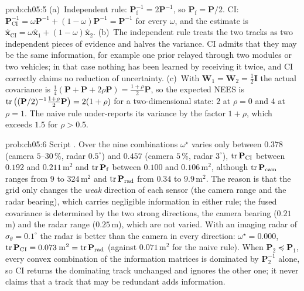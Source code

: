 \begin{sol}{prob:ch05:5}
(a)~Independent rule: $\mathbf{P}_{\mathrm{f}}^{-1}=2\mathbf{P}^{-1}$, so $\mathbf{P}_{\mathrm{f}}=\mathbf{P}/2$. CI: $\mathbf{P}_{\mathrm{CI}}^{-1}=\omega\mathbf{P}^{-1}+(1-\omega)\mathbf{P}^{-1}=\mathbf{P}^{-1}$ for every $\omega$, and the estimate is $\widehat{\mathbf{x}}_{\mathrm{CI}}=\omega\widehat{\mathbf{x}}_{1}+(1-\omega)\widehat{\mathbf{x}}_{2}$. (b)~The independent rule treats the two tracks as two independent pieces of evidence and halves the variance. CI admits that they may be the same information, for example one prior relayed through two modules or two vehicles; in that case nothing has been learned by receiving it twice, and CI correctly claims no reduction of uncertainty. (c)~With $\mathbf{W}_{1}=\mathbf{W}_{2}=\tfrac{1}{2}\mathbf{I}$ the actual covariance is $\tfrac{1}{4}(\mathbf{P}+\mathbf{P}+2\rho\mathbf{P})=\tfrac{1+\rho}{2}\mathbf{P}$, so the expected NEES is $\operatorname{tr}\big((\mathbf{P}/2)^{-1}\tfrac{1+\rho}{2}\mathbf{P}\big)=2(1+\rho)$ for a two-dimensional state: $2$ at $\rho=0$ and $4$ at $\rho=1$. The naive rule under-reports its variance by the factor $1+\rho$, which exceeds $1.5$ for $\rho>0.5$.
\end{sol}

\begin{sol}{prob:ch05:6}
Script . Over the nine combinations $\omega^{\star}$ varies only between $0.378$ (camera $5$--$30$\,\%, radar $0.5^{\circ}$) and $0.457$ (camera $5$\,\%, radar $3^{\circ}$), $\operatorname{tr}\mathbf{P}_{\mathrm{CI}}$ between $0.192$ and $0.211$\,m$^{2}$ and $\operatorname{tr}\mathbf{P}_{\mathrm{f}}$ between $0.100$ and $0.106$\,m$^{2}$, although $\operatorname{tr}\mathbf{P}_{\mathrm{cam}}$ ranges from $9$ to $324$\,m$^{2}$ and $\operatorname{tr}\mathbf{P}_{\mathrm{rad}}$ from $0.34$ to $9.9$\,m$^{2}$. The reason is that the grid only changes the \emph{weak} direction of each sensor (the camera range and the radar bearing), which carries negligible information in either rule; the fused covariance is determined by the two strong directions, the camera bearing ($0.21$\,m) and the radar range ($0.25$\,m), which are not varied. With an imaging radar of $\sigma_{\theta}=0.1^{\circ}$ the radar is better than the camera in every direction: $\omega^{\star}=0.000$, $\operatorname{tr}\mathbf{P}_{\mathrm{CI}}=0.073$\,m$^{2}=\operatorname{tr}\mathbf{P}_{\mathrm{rad}}$ (against $0.071$\,m$^{2}$ for the naive rule). When $\mathbf{P}_{2}\preceq\mathbf{P}_{1}$, every convex combination of the information matrices is dominated by $\mathbf{P}_{2}^{-1}$ alone, so CI returns the dominating track unchanged and ignores the other one; it never claims that a track that may be redundant adds information.
\end{sol}

